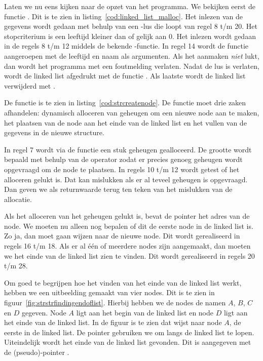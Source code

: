 
Laten we nu eens kijken naar de opzet van het programma. We bekijken eerst de functie . Dit is te zien in listing~\ref{cod:linked_list_malloc}.
%
%
Het inlezen van de gegevens wordt gedaan met behulp van een -lus die loopt van regel 8 t/m 20. Het stopcriterium is een leeftijd kleiner dan of gelijk aan 0. Het inlezen wordt gedaan in de regels 8 t/m 12 middels de bekende -functie. In regel 14 wordt de functie  aangeroepen met de leeftijd en naam als argumenten. Als het aanmaken \textsl{niet} lukt, dan wordt het programma met een foutmelding verlaten. Nadat de lus is verlaten, wordt de linked list afgedrukt met de functie . Als laatste wordt de linked list verwijderd met .

De functie  is te zien in listing~\ref{cod:strcreatenode}. De functie moet drie zaken afhandelen: dynamisch alloceren van geheugen om een nieuwe node aan te maken, het plaatsen van de node aan het einde van de linked list en het vullen van de gegevens in de nieuwe structure.


In regel 7 wordt via de functie  een stuk geheugen gealloceerd. De grootte wordt bepaald met behulp van de operator  zodat er precies genoeg geheugen wordt opgevraagd om de node te plaatsen. In regels 10 t/m 12 wordt getest of het alloceren gelukt is. Dat kan mislukken als er al teveel geheugen is opgevraagd. Dan geven we als returnwaarde  terug ten teken van het mislukken van de allocatie.

Als het alloceren van het geheugen gelukt is, bevat de pointer  het adres van de node. We moeten nu alleen nog bepalen of dit de eerste node in de linked list is. Zo ja, dan moet  gaan wijzen naar de nieuwe node. Dit wordt gerealiseerd in regels 16 t/m 18. Als er al één of meerdere nodes zijn aangemaakt, dan moeten we het einde van de linked list zien te vinden. Dit wordt gerealiseerd in regels 20 t/m 28.

Om goed te begrijpen hoe het vinden van het einde van de linked list werkt, hebben we een uitbeelding gemaakt van vier nodes. Dit is te zien in figuur~\ref{fig:strstrfindingendoflist}. Hierbij hebben we de nodes de namen $A$, $B$, $C$ en $D$ gegeven. Node $A$ ligt aan het begin van de linked list en node $D$ ligt aan het einde van de linked list. In de figuur is te zien dat  wijst naar node $A$, de eerste in de linked list. De pointer  gebruiken we om langs de linked list te lopen. Uiteindelijk wordt het einde van de linked list gevonden. Dit is aangegeven met de (pseudo)-pointer .

